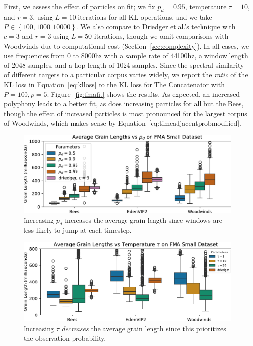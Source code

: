 \documentclass{article}
\begin{document}
First, we assess the effect of particles on fit; we fix $p_d=0.95$, temperature $\tau=10$, and $r=3$, using $L=10$ iterations for all KL operations, and we take $P \in \left\{ 100, 1000, 10000 \right\}$.  We also compare to Driedger et al.'s technique with $c=3$ and $r=3$ using $L=50$ iterations, though we omit comparisons with Woodwinds due to computational cost (Section~\ref{sec:complexity}).  In all cases, we use frequencies from $0$ to $8000$hz with a sample rate of 44100hz, a window length of 2048 samples, and a hop length of 1024 samples.  Since the spectral similarity of different targets to a particular corpus varies widely, we report the {\em ratio} of the KL loss in Equation~\ref{eq:klloss} to the KL loss for The Concatenator with $P=100, p=5$.  Figure~\ref{fig:fmafit} shows the results.  As expected, an increased polyphony leads to a better fit, as does increasing particles for all but the Bees, though the effect of increased particles is most pronounced for the largest corpus of Woodwinds, which makes sense by Equation~\ref{eq:timeadjacentprobmodified}.


\begin{figure}
    \centering
    \includegraphics[width=\columnwidth]{figs/pdGrainLengths.pdf}
    \caption{Increasing $p_d$ increases the average grain length since windows are less likely to jump at each timestep.}
    \label{fig:pdGrainLengths}
\end{figure}


\begin{figure}
    \centering
    \includegraphics[width=\columnwidth]{figs/tempGrainLengths.pdf}
    \caption{Increasing $\tau$ {\em decreases} the average grain length since this prioritizes the observation probability.}
    \label{fig:tempGrainLengths}
\end{figure}
\end{document}
